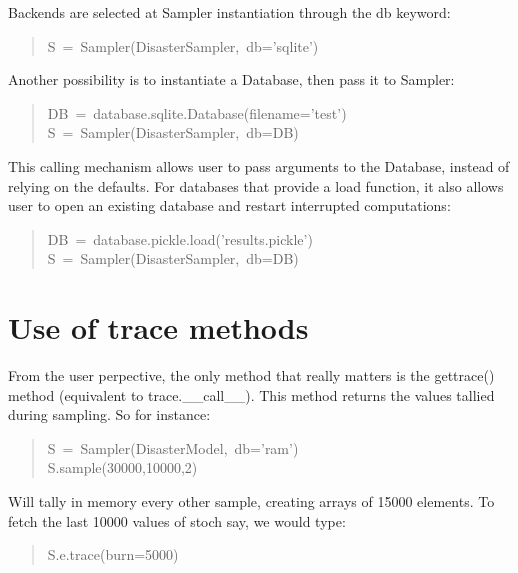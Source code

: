 Backends are selected at Sampler instantiation through the db keyword:
\begin{quote}{\ttfamily \raggedright \noindent
S~=~Sampler(DisasterSampler,~db='sqlite')
}\end{quote}

Another possibility is to instantiate a Database, then pass it to Sampler:
\begin{quote}{\ttfamily \raggedright \noindent
DB~=~database.sqlite.Database(filename='test')~\\
S~=~Sampler(DisasterSampler,~db=DB)
}\end{quote}

This calling mechanism allows user to pass arguments to the Database, instead
of relying on the defaults. For databases that provide a load function, it also
allows user to open an existing database and restart interrupted computations:
\begin{quote}{\ttfamily \raggedright \noindent
DB~=~database.pickle.load('results.pickle')~\\
S~=~Sampler(DisasterSampler,~db=DB)
}\end{quote}



\hypertarget{use-of-trace-methods}{}
\section*{Use of trace methods}
\label{use-of-trace-methods}

From the user perpective, the only method that really matters is the gettrace()
method (equivalent to trace.{\_}{\_}call{\_}{\_}). This method returns the values tallied during sampling. So for
instance:
\begin{quote}{\ttfamily \raggedright \noindent
S~=~Sampler(DisasterModel,~db='ram')~\\
S.sample(30000,10000,2)
}\end{quote}

Will tally in memory every other sample, creating arrays of 15000 elements. To
fetch the last 10000 values of stoch  say, we would type:
\begin{quote}{\ttfamily \raggedright \noindent
S.e.trace(burn=5000)
}\end{quote}



